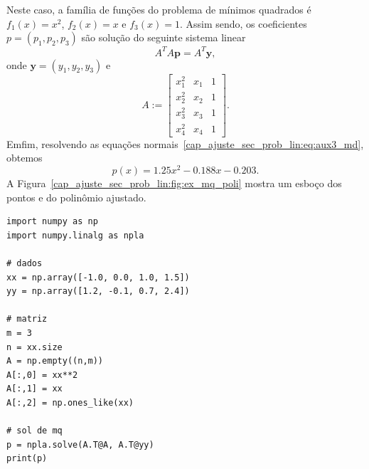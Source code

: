 \begin{ex}
  Neste caso, a família de funções do problema de mínimos quadrados é $f_1(x) = x^2$, $f_2(x) = x$ e $f_3(x) = 1$. Assim sendo, os coeficientes $p = (p_1, p_2, p_3)$ são solução do seguinte sistema linear
  \begin{equation}\label{cap_ajuste_sec_prob_lin:eq:aux3_md}
    A^TA\pmb{p} = A^T\pmb{y},
  \end{equation}
  onde $\pmb{y} = (y_1, y_2, y_3)$ e
  \begin{equation}
    A :=
    \begin{bmatrix}
      x_1^2 & x_1 & 1 \\
      x_2^2 & x_2 & 1 \\
      x_3^2 & x_3 & 1 \\
      x_4^2 & x_4 & 1
    \end{bmatrix}.
  \end{equation}
  Emfim, resolvendo as equações normais~\eqref{cap_ajuste_sec_prob_lin:eq:aux3_md}, obtemos
  \begin{equation}
    p(x) = 1.25x^2 -0.188x - 0.203.
  \end{equation}
  A Figura~\ref{cap_ajuste_sec_prob_lin:fig:ex_mq_poli} mostra um esboço dos pontos e do polinômio ajustado.

\begin{lstlisting}[caption=mqPoli.py]
import numpy as np
import numpy.linalg as npla

# dados
xx = np.array([-1.0, 0.0, 1.0, 1.5])
yy = np.array([1.2, -0.1, 0.7, 2.4])

# matriz
m = 3
n = xx.size
A = np.empty((n,m))
A[:,0] = xx**2
A[:,1] = xx
A[:,2] = np.ones_like(xx)

# sol de mq
p = npla.solve(A.T@A, A.T@yy)
print(p)
\end{lstlisting}  

\end{ex}


